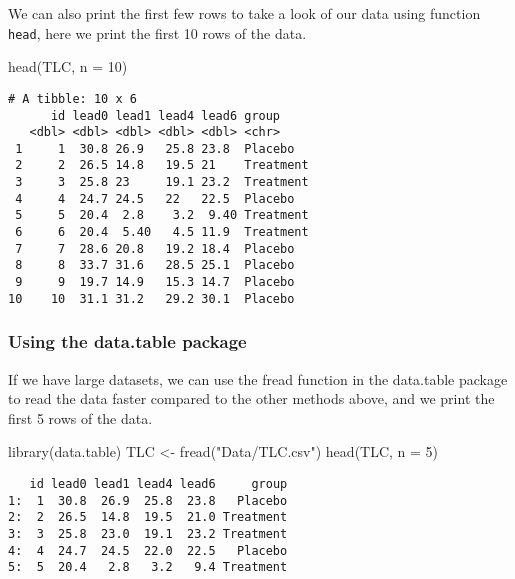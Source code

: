 \documentclass[
  letterpaper,
  DIV=11,
  numbers=noendperiod]{scrreprt}
\newenvironment{Shaded}{\begin{snugshade}}{\end{snugshade}}
\newcommand{\AttributeTok}[1]{\textcolor[rgb]{0.40,0.45,0.13}{#1}}
\newcommand{\DecValTok}[1]{\textcolor[rgb]{0.68,0.00,0.00}{#1}}
\newcommand{\FunctionTok}[1]{\textcolor[rgb]{0.28,0.35,0.67}{#1}}
\newcommand{\NormalTok}[1]{\textcolor[rgb]{0.00,0.23,0.31}{#1}}
\newcommand{\OtherTok}[1]{\textcolor[rgb]{0.00,0.23,0.31}{#1}}
\newcommand{\StringTok}[1]{\textcolor[rgb]{0.13,0.47,0.30}{#1}}
\begin{document}
We can also print the first few rows to take a look of our data using
function \texttt{head}, here we print the first 10 rows of the data.

\begin{Shaded}
\begin{Highlighting}[]
\FunctionTok{head}\NormalTok{(TLC, }\AttributeTok{n =} \DecValTok{10}\NormalTok{)}
\end{Highlighting}
\end{Shaded}

\begin{verbatim}
# A tibble: 10 x 6
      id lead0 lead1 lead4 lead6 group    
   <dbl> <dbl> <dbl> <dbl> <dbl> <chr>    
 1     1  30.8 26.9   25.8 23.8  Placebo  
 2     2  26.5 14.8   19.5 21    Treatment
 3     3  25.8 23     19.1 23.2  Treatment
 4     4  24.7 24.5   22   22.5  Placebo  
 5     5  20.4  2.8    3.2  9.40 Treatment
 6     6  20.4  5.40   4.5 11.9  Treatment
 7     7  28.6 20.8   19.2 18.4  Placebo  
 8     8  33.7 31.6   28.5 25.1  Placebo  
 9     9  19.7 14.9   15.3 14.7  Placebo  
10    10  31.1 31.2   29.2 30.1  Placebo  
\end{verbatim}

\hypertarget{using-the-data.table-package}{%
\subsubsection{Using the data.table
package}\label{using-the-data.table-package}}

If we have large datasets, we can use the fread function in the
data.table package to read the data faster compared to the other methods
above, and we print the first 5 rows of the data.

\begin{Shaded}
\begin{Highlighting}[]
\FunctionTok{library}\NormalTok{(data.table)}
\NormalTok{TLC }\OtherTok{\textless{}{-}} \FunctionTok{fread}\NormalTok{(}\StringTok{"Data/TLC.csv"}\NormalTok{)}
\FunctionTok{head}\NormalTok{(TLC, }\AttributeTok{n =} \DecValTok{5}\NormalTok{)}
\end{Highlighting}
\end{Shaded}

\begin{verbatim}
   id lead0 lead1 lead4 lead6     group
1:  1  30.8  26.9  25.8  23.8   Placebo
2:  2  26.5  14.8  19.5  21.0 Treatment
3:  3  25.8  23.0  19.1  23.2 Treatment
4:  4  24.7  24.5  22.0  22.5   Placebo
5:  5  20.4   2.8   3.2   9.4 Treatment
\end{verbatim}
\end{document}
